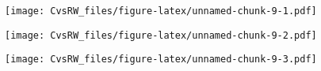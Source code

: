 \documentclass[
]{article}
\newenvironment{Shaded}{\begin{snugshade}}{\end{snugshade}}
\newcommand{\DataTypeTok}[1]{\textcolor[rgb]{0.13,0.29,0.53}{#1}}
\newcommand{\DecValTok}[1]{\textcolor[rgb]{0.00,0.00,0.81}{#1}}
\newcommand{\KeywordTok}[1]{\textcolor[rgb]{0.13,0.29,0.53}{\textbf{#1}}}
\newcommand{\NormalTok}[1]{#1}
\newcommand{\OperatorTok}[1]{\textcolor[rgb]{0.81,0.36,0.00}{\textbf{#1}}}
\newcommand{\StringTok}[1]{\textcolor[rgb]{0.31,0.60,0.02}{#1}}
\begin{document}
\texttt{[image: CvsRW\_files/figure-latex/unnamed-chunk-9-1.pdf]}

\begin{Shaded}
\end{Shaded}

\texttt{[image: CvsRW\_files/figure-latex/unnamed-chunk-9-2.pdf]}

\begin{Shaded}
\end{Shaded}

\texttt{[image: CvsRW\_files/figure-latex/unnamed-chunk-9-3.pdf]}
\end{document}
